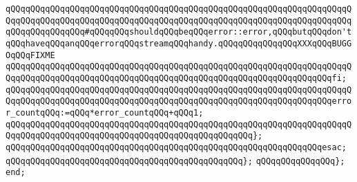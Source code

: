 \verb|qQQqqQQqqQQqqQQqqQQqqQQqqQQqqQQqqQQqqQQqqQQqqQQqqQQqqQQqqQQqqQQqqQQqqQQqqQQqqQQqqQQqqQQqqQQqqQQqqQQqqQQqqQQqqQQqqQQqqQQqqQQqqQQqqQQqqQQqqQQqqQQqqQQqqQQqqQQq#qQQqqQQqshouldqQQqbeqQQqerror::error,qQQqbutqQQqdon'tqQQqhaveqQQqanqQQqerrorqQQqstreamqQQqhandy.qQQqqQQqqQQqqQQqXXXqQQqBUGGOqQQqFIXME|\newline
\verb|qQQqqQQqqQQqqQQqqQQqqQQqqQQqqQQqqQQqqQQqqQQqqQQqqQQqqQQqqQQqqQQqqQQqqQQqqQQqqQQqqQQqqQQqqQQqqQQqqQQqqQQqqQQqqQQqqQQqqQQqqQQqqQQqqQQqqQQqfi;|\newline
\newline
\verb|qQQqqQQqqQQqqQQqqQQqqQQqqQQqqQQqqQQqqQQqqQQqqQQqqQQqqQQqqQQqqQQqqQQqqQQqqQQqqQQqqQQqqQQqqQQqqQQqqQQqqQQqqQQqqQQqqQQqqQQqqQQqqQQqqQQqqQQqerror_countqQQq:=qQQq*error_countqQQq+qQQq1;|\newline
\verb|qQQqqQQqqQQqqQQqqQQqqQQqqQQqqQQqqQQqqQQqqQQqqQQqqQQqqQQqqQQqqQQqqQQqqQQqqQQqqQQqqQQqqQQqqQQqqQQqqQQqqQQqqQQqqQQqqQQqqQQq};|\newline
\verb|qQQqqQQqqQQqqQQqqQQqqQQqqQQqqQQqqQQqqQQqqQQqqQQqqQQqqQQqqQQqqQQqesac;|\newline
\verb|qQQqqQQqqQQqqQQqqQQqqQQqqQQqqQQqqQQqqQQqqQQqqQQq};|\newline
\verb|qQQqqQQqqQQqqQQq};|\newline
\verb|end;|\newline
\newline

